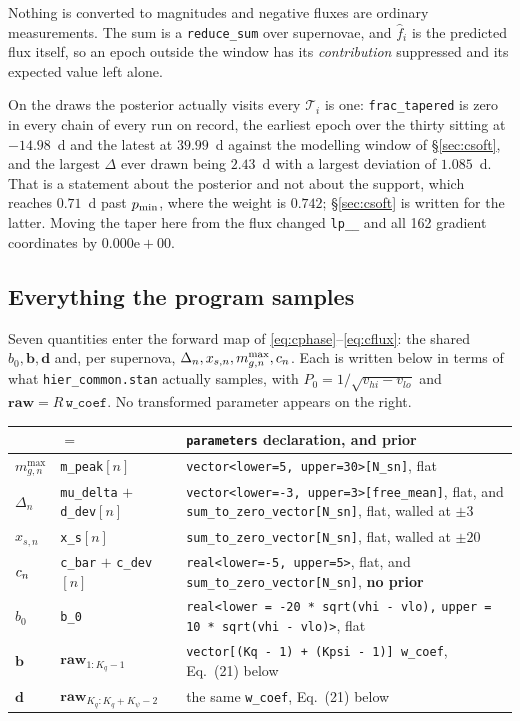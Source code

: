 \documentclass[11pt]{article}
\newcommand{\code}[1]{\texttt{#1}}
\begin{document}
Nothing is converted to magnitudes and negative fluxes are ordinary measurements. The sum
is a \code{reduce\_sum} over supernovae, and $\hat f_{i}$ is the predicted flux itself, so
an epoch outside the window has its \emph{contribution} suppressed and its expected value
left alone.

On the draws the posterior actually visits every $\mathcal{T}_{i}$ is one:
\code{frac\_tapered} is zero in every chain of every run on record, the earliest epoch
over the thirty sitting at $-14.98$~d and the latest at $39.99$~d against the modelling
window of \S\ref{sec:csoft}, and the largest $\Delta$ ever drawn being $2.43$~d with a
largest deviation of $1.085$~d. That is a statement about the posterior and not about the support, which reaches
$0.71$~d past $p_{\min}$, where the weight is $0.742$; \S\ref{sec:csoft} is written for
the latter. Moving the taper here from the flux changed \code{lp\_\_} and all 162 gradient
coordinates by $0.000\mathrm{e}{+}00$.

\subsection{Everything the program samples}
\label{sec:csamples}

Seven quantities enter the forward map of \eqref{eq:cphase}--\eqref{eq:cflux}: the shared
$b_{0}, \mathbf{b}, \mathbf{d}$ and, per supernova,
$\Delta_{n}, x_{s,n}, m_{g,n}^{\max}, c_{n}$. Each is written below in terms of what
\code{hier\_common.stan} actually samples, with $P_{0} = 1/\sqrt{v_{hi}-v_{lo}}$ and
$\mathbf{raw} = R\,\code{w\_coef}$. No transformed parameter appears on the right.

\begin{tabular}{@{}l l p{}@{}}
\toprule
 & $=$ & \code{parameters} declaration, and prior \\
\midrule
$m_{g,n}^{\max}$ & \code{m\_peak}$[n]$
                 & \code{vector<lower=5, upper=30>[N\_sn]}, flat \\[2pt]
$\Delta_{n}$     & \code{mu\_delta} $+$ \code{d\_dev}$[n]$
                 & \code{vector<lower=-3, upper=3>[free\_mean]}, flat, and
                   \code{sum\_to\_zero\_vector[N\_sn]}, flat, walled at $\pm 3$ \\[2pt]
$x_{s,n}$        & \code{x\_s}$[n]$
                 & \code{sum\_to\_zero\_vector[N\_sn]}, flat, walled at $\pm 20$ \\[2pt]
$c_{n}$      & \code{c\_bar} $+$ \code{c\_dev}$[n]$
                 & \code{real<lower=-5, upper=5>}, flat, and
                   \code{sum\_to\_zero\_vector[N\_sn]}, \textbf{no prior} \\
$b_{0}$          & \code{b\_0}
                 & \code{real<lower = -20 * sqrt(vhi - vlo),} \code{upper = 10 * sqrt(vhi - vlo)>}, flat \\[2pt]
$\mathbf{b}$     & $\mathbf{raw}_{1:K_{q}-1}$
                 & \code{vector[(Kq - 1) + (Kpsi - 1)] w\_coef}, Eq.~(21) below \\[2pt]
$\mathbf{d}$     & $\mathbf{raw}_{K_{q}:K_{q}+K_{\psi}-2}$
                 & the same \code{w\_coef}, Eq.~(21) below \\[2pt]
\bottomrule
\end{tabular}
\end{document}
